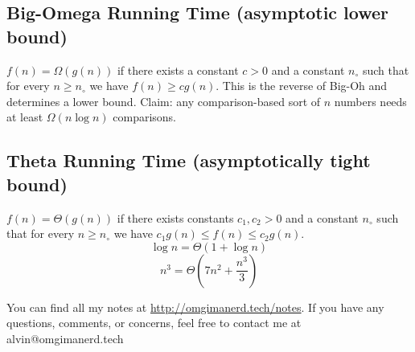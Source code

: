 \documentclass[letterpaper, 12pt]{math}
\begin{document}
\subsection*{Big-Omega Running Time (asymptotic lower bound)}
\( f(n) = \Omega(g(n)) \) if there exists a constant \( c > 0 \) and a constant
\( n_{\circ} \) such that for every \( n \geq n_{\circ} \) we have
\( f(n) \geq cg(n) \). This is the reverse of Big-Oh and determines a lower
bound. Claim: any comparison-based sort of \( n \) numbers needs at least
\( \Omega(n\log n) \) comparisons.

\subsection*{Theta Running Time (asymptotically tight bound)}
\( f(n) = \Theta(g(n)) \) if there exists constants \( c_{1},c_{2} > 0 \) and
a constant \( n_{\circ} \) such that for every \( n \geq n_{\circ} \) we have
\( c_{1}g(n) \leq f(n) \leq c_{2}g(n) \).
\[ \log n = \Theta(1+\log n) \]
\[ n^3 = \Theta(7n^2+\frac{n^3}{3}) \]

\begin{center}
  You can find all my notes at \url{http://omgimanerd.tech/notes}. If you have
  any questions, comments, or concerns, feel free to contact me at
  alvin@omgimanerd.tech
\end{center}
\end{document}
